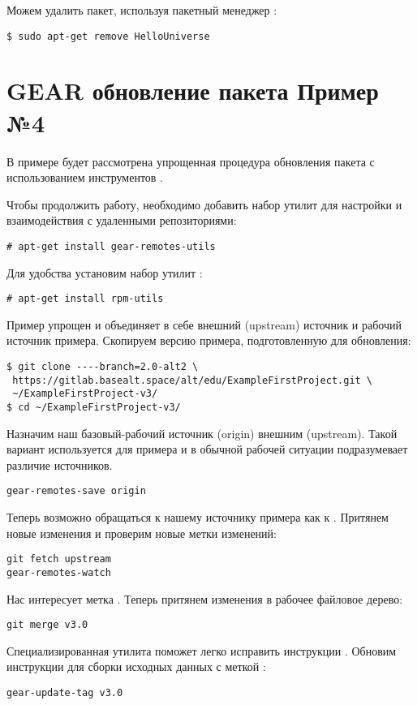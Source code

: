 Можем удалить пакет, используя пакетный менеджер :
\begin{verbatim}
$ sudo apt-get remove HelloUniverse
\end{verbatim}

\section{GEAR обновление пакета \textbf{Пример №4}}

В примере будет рассмотрена упрощенная процедура обновления пакета с
использованием инструментов .

Чтобы продолжить работу, необходимо добавить набор утилит  для
настройки и взаимодействия с удаленными репозиториями:
\begin{verbatim}
# apt-get install gear-remotes-utils
\end{verbatim}

Для удобства установим набор утилит :
\begin{verbatim}
# apt-get install rpm-utils
\end{verbatim}

Пример упрощен и объединяет в себе внешний (upstream) источник и
рабочий источник примера. Скопируем версию примера, подготовленную для
обновления:
\begin{verbatim}
$ git clone ----branch=2.0-alt2 \
 https://gitlab.basealt.space/alt/edu/ExampleFirstProject.git \
 ~/ExampleFirstProject-v3/
$ cd ~/ExampleFirstProject-v3/
\end{verbatim}

Назначим наш базовый-рабочий источник (origin) внешним (upstream). Такой вариант
используется для примера и в обычной рабочей ситуации подразумевает различие источников.
\begin{verbatim}
gear-remotes-save origin
\end{verbatim}

Теперь возможно обращаться к нашему источнику примера как к .
Притянем новые изменения и проверим новые метки изменений:
\begin{verbatim}
git fetch upstream
gear-remotes-watch
\end{verbatim}

Нас интересует метка . Теперь притянем изменения в рабочее файловое дерево:
\begin{verbatim}
git merge v3.0
\end{verbatim}

Специализированная утилита поможет легко исправить инструкции .
Обновим инструкции для сборки исходных данных с меткой :
\begin{verbatim}
gear-update-tag v3.0
\end{verbatim}

